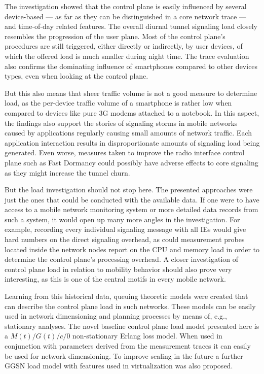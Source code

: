 The investigation showed that the control plane is easily influenced by several device-based --- as far as they can be distinguished in a core network trace --- and time-of-day related features. The overall diurnal tunnel signaling load closely resembles the progression of the user plane. Most of the control plane's procedures are still triggered, either directly or indirectly, by user devices, of which the offered load is much smaller during night time. The trace evaluation also confirms 
the dominating influence of smartphones compared to other devices types, even when looking at the control plane.

But this also means that sheer traffic volume is not a good measure to determine load, as the per-device traffic volume of a smartphone is rather low when compared to devices like pure \gls{3G} modems attached to a notebook. In this aspect, the findings also support the stories of signaling storms in mobile networks caused by applications regularly causing small amounts of network traffic. Each application interaction results in disproportionate amounts of signaling load being generated. Even worse, measures taken to improve the radio interface control plane such as Fast Dormancy could possibly have adverse effects to core signaling as they might increase the tunnel churn.

But the load investigation should not stop here. The presented approaches were just the ones that could be conducted with the available data. If one were to have access to a mobile network monitoring system or more detailed data records from such a system, it would open up many more angles in the investigation. For example, recording every individual signaling message with all \glspl{IE} would give hard numbers on the direct signaling overhead, as could measurement probes located inside the network nodes report on the CPU and memory load in order to determine the control plane's processing overhead. A closer investigation of control plane load in relation to mobility behavior should also prove very interesting, as this is one of the central motifs in every mobile network.

Learning from this historical data, queuing theoretic models were created that can describe the control plane load in such networks. These models can be easily used in network dimensioning and planning processes by means of, e.g., stationary analyses. The novel baseline control plane load model presented here is a $M(t)/G(t)/c/0$ non-stationary Erlang loss model. When used in conjunction with parameters derived from the measurement traces it can easily be used for network dimensioning. To improve scaling in the future a further \gls{GGSN} load model with features used in virtualization was also proposed.

